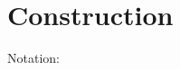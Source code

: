 \newcommand{\sameType}[4]{\ensuremath{#1 \sim #2 \downarrow #3 \in #4}}
\newcommand{\sameTypeOne}[6]{\ensuremath{\isOf{#1}{#2} \rhd #3 \sim #4 \downarrow #5 \in #6}}
\newcommand{\sameComp}[4]{\ensuremath{#1 \rhd #2 \sim #3 \in #4}}
\newcommand{\equivComp}[3]{\ensuremath{#1 \RHD #2 \asymp #3}}
\newcommand{\CComp}[4]{\ensuremath{\diamond #1 \rhd #2 \in #3 \diamond #4}}
\newcommand{\CCompOne}[6]
{\ensuremath{\isOf{#1}{#2} \diamond #3  \rhd #4 \in #5 \diamond #6}}

\newcommand{\type}[1]{\mathtt{Type}_{#1}}
\newcommand{\term}{\mathsf{Term}}
\newcommand{\evalTo}[1]{{#1}^{\Downarrow}}
\newcommand{\class}[1]{\ensuremath{[#1]}}
\newcommand{\cost}[1]{\ensuremath{\mathcal{C}}(#1)}
\newcommand{\fequiv}[2]{\ensuremath{#1 \asymp #2}}
\newcommand{\arrabt}[3]{\ensuremath{\Pi(#1; #2; #3)}}
\newcommand{\relpot}[4]{\ensuremath{\mathtt{relpot}(#1.#2; #3.#4)}}
\newcommand{\relpotty}[3]{\ensuremath{\mathtt{relpotty}(#1;#2.#3)}}
\section{Construction}

Notation:

